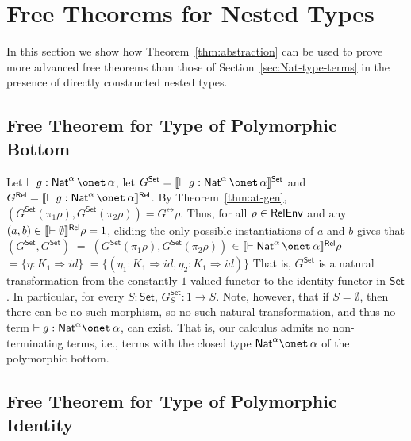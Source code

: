 \documentclass[runningheads]{llncs}
\newcommand{\set}{\mathsf{Set}}
\renewcommand{\id}{\mathit{id}}
\renewcommand{\id}{\mathit{id}}
\begin{document}
\section{Free Theorems for Nested Types}\label{sec:ftnt}

In this section we show how Theorem~\ref{thm:abstraction} can be used
to prove more advanced free theorems than those of
Section~\ref{sec:Nat-type-terms} in the presence of directly
constructed nested types.

\subsection{Free Theorem for Type of Polymorphic
  Bottom}\label{sec:bottom} 

Let $ \vdash g : \Nat^\alpha \,\onet\,\alpha$, let $G^\set =
\setsem{\vdash g : \Nat^\alpha \,\onet\,\alpha}$ and $G^\rel =
\relsem{\vdash g : \Nat^\alpha \,\onet\,\alpha}$.  By
Theorem~\ref{thm:at-gen}, $(G^\set(\pi_1\rho),G^\set(\pi_2\rho))
= G^\rel\rho$. Thus, for all $\rho \in \mathsf{RelEnv}$ and any $(a, b) \in
\llbracket{\vdash \emptyset}\rrbracket^{\mathsf{Rel}}\rho = 1$, eliding the only possible
instantiations of $a$ and $b$ gives that
$(G^\set,G^\set) \;= \; (G^\set(\pi_1 \rho), G^\set (\pi_2 \rho))$
$ \in  \relsem{\vdash \Nat^\alpha \,\onet\,\alpha}\rho$
$ =  \{\eta : K_1 \Rightarrow \id\}$
$ =  \{(\eta_1 : K_1 \Rightarrow \id, \eta_2 : K_1 \Rightarrow
\id)\}$ 
That is, $G^\set$ is a natural transformation from the constantly
$1$-valued functor to the identity functor in $\set$. In particular,
for every $S : \set$, $G^\set_S : 1 \to S$. Note, however, that if $S
= \emptyset$, then there can be no such morphism, so no such natural
transformation,
and thus no term $\vdash g : \Nat^\alpha \onet \,\alpha$, can exist.
That is, our calculus admits no non-terminating terms, i.e., terms
with the closed type $\Nat^\alpha \onet \,\alpha$ of the polymorphic
bottom.

\subsection{Free Theorem for Type of Polymorphic
  Identity}\label{sec:identity} 
\end{document}
